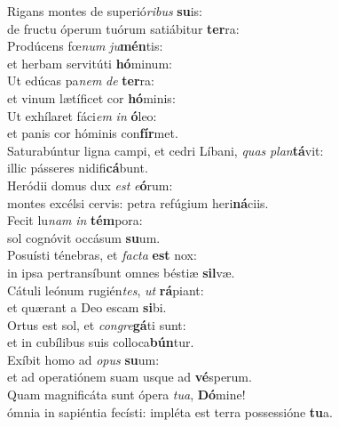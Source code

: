 \evenverse Rigans montes de superió\textit{ri}\textit{bus} \textbf{su}is:~\*\\
\evenverse de fructu óperum tuórum satiábitur \textbf{ter}ra:\\
\oddverse Prodúcens fœ\textit{num} \textit{ju}\textbf{mén}tis:~\*\\
\oddverse et herbam servitúti \textbf{hó}minum:\\
\evenverse Ut edúcas pa\textit{nem} \textit{de} \textbf{ter}ra:~\*\\
\evenverse et vinum lætíficet cor \textbf{hó}minis:\\
\oddverse Ut exhílaret fáci\textit{em} \textit{in} \textbf{ó}leo:~\*\\
\oddverse et panis cor hóminis con\textbf{fír}met.\\
\evenverse Saturabúntur ligna campi, et cedri Líbani, \textit{quas} \textit{plan}\textbf{tá}vit:~\*\\
\evenverse illic pásseres nidifi\textbf{cá}bunt.\\
\oddverse Heródii domus dux \textit{est} \textit{e}\textbf{ó}rum:~\*\\
\oddverse montes excélsi cervis: petra refúgium heri\textbf{ná}ciis.\\
\evenverse Fecit lu\textit{nam} \textit{in} \textbf{tém}pora:~\*\\
\evenverse sol cognóvit occásum \textbf{su}um.\\
\oddverse Posuísti ténebras, et \textit{fa}\textit{cta} \textbf{est} nox:~\*\\
\oddverse in ipsa pertransíbunt omnes béstiæ \textbf{sil}væ.\\
\evenverse Cátuli leónum rugién\textit{tes}, \textit{ut} \textbf{rá}piant:~\*\\
\evenverse et quærant a Deo escam \textbf{si}bi.\\
\oddverse Ortus est sol, et \textit{con}\textit{gre}\textbf{gá}ti sunt:~\*\\
\oddverse et in cubílibus suis colloca\textbf{bún}tur.\\
\evenverse Exíbit homo ad \textit{o}\textit{pus} \textbf{su}um:~\*\\
\evenverse et ad operatiónem suam usque ad \textbf{vé}sperum.\\
\oddverse Quam magnificáta sunt ópera \textit{tu}\textit{a}, \textbf{Dó}mine!~\*\\
\oddverse ómnia in sapiéntia fecísti: impléta est terra possessióne \textbf{tu}a.\\
